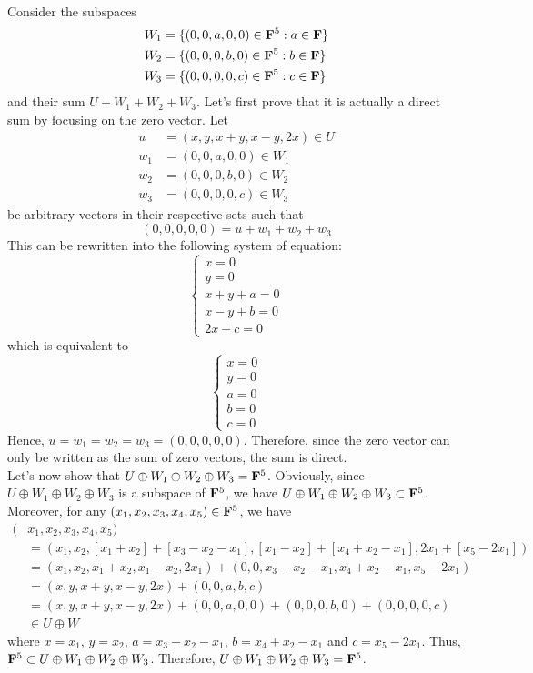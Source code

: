 \begin{solution}
    \\ Consider the subspaces
    \begin{align*}
        W_1 &= \{(0, 0, a, 0, 0) \in \mathbf{F}^5 : a \in \mathbf{F} \} \\
        W_2 &= \{(0, 0, 0, b, 0) \in \mathbf{F}^5 : b \in \mathbf{F} \} \\
        W_3 &= \{(0, 0, 0, 0, c) \in \mathbf{F}^5 : c \in \mathbf{F} \}
    \end{align*}
    and their sum $U + W_1 + W_2 + W_3$. Let's first prove that it is actually a direct sum by focusing on the zero vector. Let 
    \begin{align*}
        u &= (x, y, x+y, x-y, 2x) \in U \\
        w_1 &= (0, 0, a, 0, 0) \in W_1 \\
        w_2 &= (0,0,0,b,0) \in W_2 \\
        w_3 &= (0,0,0,0,c) \in W_3
    \end{align*}
    be arbitrary vectors in their respective sets such that
    $$(0,0,0,0,0) = u + w_1 + w_2 + w_3$$
    This can be rewritten into the following system of equation:
    $$\begin{cases}
        x=0 \\ y = 0\\x + y + a = 0 \\ x - y + b = 0 \\ 2x + c = 0
    \end{cases}$$
    which is equivalent to
    $$\begin{cases}
        x=0 \\ y=0 \\ a=0 \\ b=0 \\ c=0
    \end{cases}$$
    Hence, $u = w_1 = w_2 = w_3 = (0,0,0,0,0)$. Therefore, since the zero vector can only be written as the sum of zero vectors, the sum is direct. \\
    Let's now show that $U \oplus W_1 \oplus W_2 \oplus W_3 = \mathbf{F}^5$. Obviously, since $U \oplus W_1 \oplus W_2 \oplus W_3$ is a subspace of $\mathbf{F}^5$, we have $U \oplus W_1 \oplus W_2 \oplus W_3 \subset \mathbf{F}^5$. Moreover, for any $(x_1, x_2, x_3, x_4, x_5) \in \mathbf{F}^5$, we have
    \begin{align*}
        (&x_1, x_2, x_3, x_4, x_5)\\
        &= (x_1, x_2, [x_1 + x_2] + [x_3 - x_2 - x_1], [x_1 - x_2] + [x_4 + x_2 - x_1], 2x_1 + [x_5 - 2x_1]) \\
        &= (x_1, x_2, x_1+x_2, x_1 - x_2,2x_1) + (0,0,x_3 - x_2 - x_1, x_4 + x_2 - x_1, x_5 - 2x_1) \\
        &= (x,y,x+y,x-y, 2x) + (0,0,a,b,c) \\
        &= (x,y,x+y,x-y, 2x) + (0,0,a,0,0) + (0,0,0,b,0) + (0,0,0,0,c) \\
        &\in U \oplus W
    \end{align*}
    where $x = x_1$, $y=x_2$, $a = x_3 - x_2 - x_1$, $b = x_4 + x_2 - x_1$ and $c = x_5 - 2x_1$. Thus, $\mathbf{F}^5 \subset U \oplus W_1 \oplus W_2 \oplus W_3$. Therefore, $U \oplus W_1 \oplus W_2 \oplus W_3 = \mathbf{F}^5$. \\
\end{solution}


